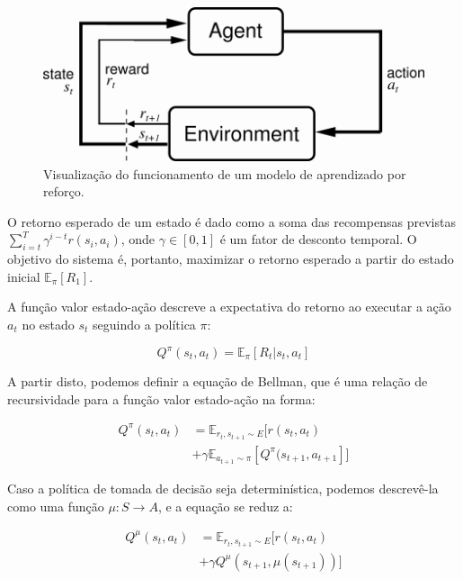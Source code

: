 \documentclass[twoside,conference,a4paper]{IEEEtran}
\begin{document}
\begin{figure}[ht!]
  \centering
  \includegraphics[width=0.7\hsize]{figuras/reinforcement.png}
  \caption{Visualização do funcionamento de um modelo de aprendizado por reforço.}
  \label{fig:reforco}
\end{figure}

O retorno esperado de um estado é dado como a soma das recompensas previstas $\sum_{i = t}^{T}\gamma^{i-t}r(s_i,a_i)$, onde $\gamma \in [0,1]$ é um fator de desconto temporal. O objetivo do sistema é, portanto, maximizar o retorno esperado a partir do estado inicial $\mathbb{E}_{\pi}[R_1]$.

A função valor estado-ação descreve a expectativa do retorno ao executar a ação $a_t$ no estado $s_t$ seguindo a política $\pi$:

\begin{equation}
Q^{\pi}(s_t,a_t) = \mathbb{E}_{\pi}[R_t|s_t,a_t]
\end{equation}

A partir disto, podemos definir a equação de Bellman, que é uma relação de recursividade para a função valor estado-ação na forma:

\begin{equation}
\begin{split}
Q^{\pi}(s_t,a_t) & = \mathbb{E}_{r_t,s_{t+1}{\sim}E}[r(s_t,a_t) \\
& +\gamma \mathbb{E}_{a_{t+1}{\sim}\pi}[Q^{\pi}(s_{t+1},a_{t+1}]]
\end{split}
\end{equation}

Caso a política de tomada de decisão seja determinística, podemos descrevê-la como uma função $\mu : S \rightarrow A$, e a equação se reduz a:

\begin{equation}
\begin{split}
Q^{\mu}(s_t,a_t) & = \mathbb{E}_{r_t,s_{t+1}{\sim}E}[r(s_t,a_t) \\
& + \gamma Q^{\mu}(s_{t+1},\mu(s_{t+1}))]
\end{split}
\end{equation}
\end{document}
